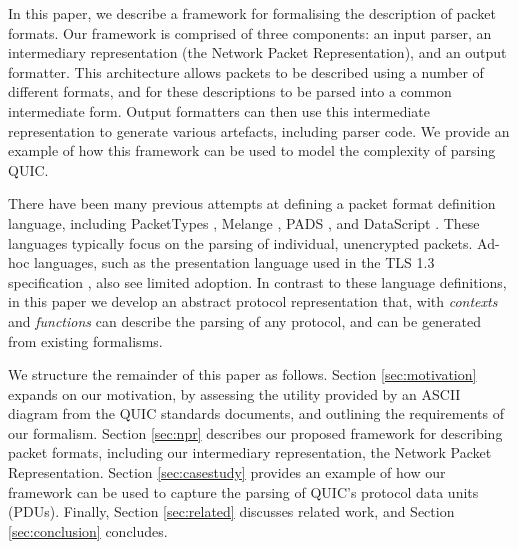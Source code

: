 \documentclass[10pt,sigconf]{acmart}
\begin{document}
In this paper, we describe a framework for formalising the description of packet formats.
Our framework is comprised of three components: an input parser, an intermediary
representation (the Network Packet Representation), and an output formatter. This
architecture allows packets to be described using a number of different formats, and for
these descriptions to be parsed into a common intermediate form. Output formatters can then
use this intermediate representation to generate various artefacts, including parser code.
We provide an example of how this framework can be used to model the complexity of parsing
QUIC.


There have been many previous attempts at defining a packet format definition language,
including PacketTypes \cite{mccann2000packet}, Melange \cite{madhavapeddy2007melange},
PADS \cite{fisher2005pads}, and DataScript \cite{back2002datascript}. These languages
typically focus on the parsing of individual, unencrypted packets. Ad-hoc languages, such
as the presentation language used in the TLS 1.3 specification
\cite{draft-ietf-tls-tls13-28}, also see limited adoption. In contrast to these language
definitions, in this paper we develop an abstract protocol representation that, with
\emph{contexts} and \emph{functions} can describe the parsing of any protocol, and can be
generated from existing formalisms.


We structure the remainder of this paper as follows. Section \ref{sec:motivation} expands
on our motivation, by assessing the utility provided by an ASCII diagram from the QUIC
standards documents, and outlining the requirements of our formalism. Section
\ref{sec:npr} describes our proposed framework for describing packet formats,
including our intermediary representation, the Network Packet Representation. Section
\ref{sec:casestudy} provides an example of how our framework can be used to capture
the parsing of QUIC's protocol data units (PDUs). Finally, Section \ref{sec:related} discusses
related work, and Section \ref{sec:conclusion} concludes.
\end{document}
